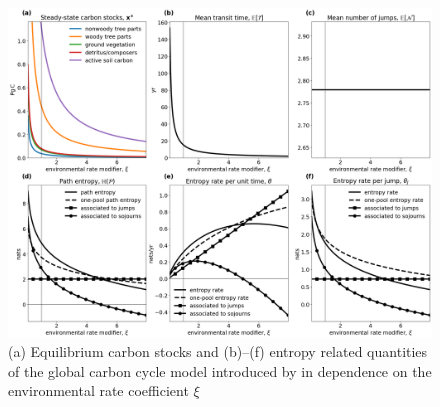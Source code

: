 \documentclass[smallextended]{svjour3}
\makeatletter
\renewcommand*{\eqref}[1]{%
  \hyperref[{#1}]{\textup{\tagform@{\ref*{#1}}}}%
}
\makeatother
\begin{document}
\begin{figure}[htbp]
    \centering
    \includegraphics[width=1.0\linewidth]{figs/Emanuel_entropies.png}
    \caption{
    (a) Equilibrium carbon stocks and (b)--(f) entropy related quantities of the global carbon cycle model introduced by \citet{Emanuel1981} in dependence on the environmental rate coefficient $\xi$
  }
  \label{fig:Emanuel_entropies}
\end{figure}
\end{document}
